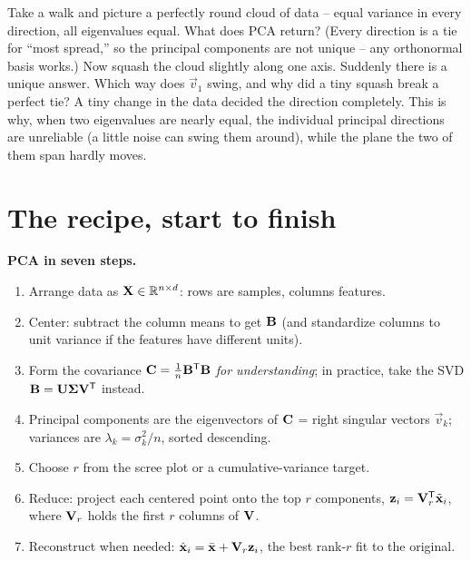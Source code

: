 \begin{walkbox}
Take a walk and picture a perfectly round cloud of data -- equal variance in every
direction, all eigenvalues equal. What does PCA return? (Every direction is a tie
for ``most spread,'' so the principal components are not unique -- any orthonormal
basis works.) Now squash the cloud slightly along one axis. Suddenly there is a
unique answer. Which way does $\vec v_1$ swing, and why did a tiny squash break a
perfect tie? A tiny change in the data decided the direction completely. This is why,
when two eigenvalues are nearly equal, the individual principal directions are
unreliable (a little noise can swing them around), while the plane the two of them
span hardly moves.
\end{walkbox}

\section{The recipe, start to finish}

\begin{focusbox}
\textbf{PCA in seven steps.}
\begin{enumerate}
  \item Arrange data as $\mathbf{X}\in\mathbb{R}^{n\times d}$: rows are samples, columns features.
  \item Center: subtract the column means to get $\mathbf{B}$ (and standardize columns
        to unit variance if the features have different units).
  \item Form the covariance $\mathbf{C}=\tfrac1n\mathbf{B}^{\mathsf{T}}\mathbf{B}$ \emph{for understanding};
        in practice, take the SVD $\mathbf{B}=\mathbf{U}\mathbf{\Sigma}\mathbf{V}^{\mathsf{T}}$ instead.
  \item Principal components are the eigenvectors of $\mathbf{C}$ = right singular
        vectors $\vec v_k$; variances are $\lambda_k=\sigma_k^2/n$, sorted descending.
  \item Choose $r$ from the scree plot or a cumulative-variance target.
  \item Reduce: project each centered point onto the top $r$ components,
        $\mathbf{z}_i=\mathbf{V}_r^{\mathsf{T}}\tilde{\mathbf{x}}_i$, where $\mathbf{V}_r$ holds the first
        $r$ columns of $\mathbf{V}$.
  \item Reconstruct when needed: $\hat{\mathbf{x}}_i=\bar{\mathbf{x}}+\mathbf{V}_r\mathbf{z}_i$, the
        best rank-$r$ fit to the original.
\end{enumerate}
\end{focusbox}

